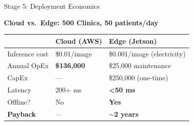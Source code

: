 \documentclass[aspectratio=169, 12pt]{beamer}
\begin{document}
\begin{frame}{Stage 5: Deployment Economics}
\note{
%
%
%
%
}

\footnotesize
\textbf{Cloud vs.\ Edge: 500 Clinics, 50 patients/day}

\vspace{0.05cm}
\scriptsize
\renewcommand{\arraystretch}{1.05}
\begin{tabular}{@{}lll@{}}
  \toprule
  & \textbf{Cloud (AWS)} & \textbf{Edge (Jetson)} \\
  \midrule
  Inference cost  & \$0.01/image       & \$0.001/image (electricity) \\
  Annual OpEx     & \textbf{\$136,000} & \$25,000 maintenance \\
  CapEx           & ---                & \$250,000 (one-time) \\
  Latency         & 200+ ms            & \textbf{<50 ms} \\
  Offline?        & No                 & \textbf{Yes} \\
  \midrule
  \textbf{Payback} & --- & \textbf{$\sim$2 years} \\
  \bottomrule
\end{tabular}

\vspace{0.1cm}
\footnotesize
{}

\end{frame}
\end{document}
